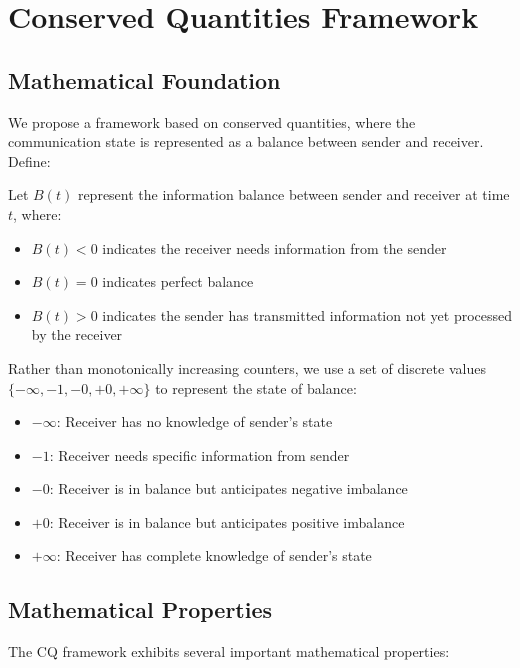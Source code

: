 \documentclass[../../../OAE-SPEC-MAIN.tex]{subfiles}
\begin{document}
\section{Conserved Quantities Framework}

\subsection{Mathematical Foundation}

We propose a framework based on conserved quantities, where the communication state is represented as a balance between sender and receiver. Define:

\begin{highlightbox}
Let $B(t)$ represent the information balance between sender and receiver at time $t$, where:
\begin{itemize}
    \item $B(t) < 0$ indicates the receiver needs information from the sender
    \item $B(t) = 0$ indicates perfect balance
    \item $B(t) > 0$ indicates the sender has transmitted information not yet processed by the receiver
\end{itemize}
\end{highlightbox}

Rather than monotonically increasing counters, we use a set of discrete values $\{-\infty, -1, -0, +0, +\infty\}$ to represent the state of balance:

\begin{itemize}
    \item $-\infty$: Receiver has no knowledge of sender's state
    \item $-1$: Receiver needs specific information from sender
    \item $-0$: Receiver is in balance but anticipates negative imbalance
    \item $+0$: Receiver is in balance but anticipates positive imbalance
    \item $+\infty$: Receiver has complete knowledge of sender's state
\end{itemize}

\subsection{Mathematical Properties}

The CQ framework exhibits several important mathematical properties:
\end{document}
